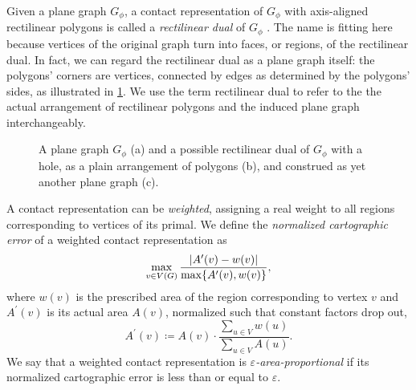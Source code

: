 Given a plane graph $G_\phi$, a contact representation of $G_\phi$ with axis-aligned rectilinear polygons is called a \emph{rectilinear dual} of $G_\phi$ \cite{alam2013computing}.
The name  is fitting here because vertices of the original graph turn into faces, or regions, of the rectilinear dual.
In fact, we can regard the rectilinear dual as a plane graph itself: the polygons' corners are vertices, connected by edges as determined by the polygons' sides, as illustrated in \cref{fig:preliminaries-rectilinear-dual}.
We use the term rectilinear dual to refer to the the actual arrangement of rectilinear polygons and the induced plane graph interchangeably.

\begin{figure}[H]
	\centering
	\quad
	\quad
	\caption{A plane graph $G_\phi$ (a) and a possible rectilinear dual of $G_\phi$ with a hole, as a plain arrangement of polygons (b), and construed as yet another plane graph (c).}
	\label{fig:preliminaries-rectilinear-dual}
\end{figure}

A contact representation can be \emph{weighted}, assigning a real weight to all regions corresponding to vertices of its primal.
We define the \emph{normalized cartographic error} \cite{alam2015quantitative} of a weighted contact representation as
%
\begin{equation*}
    \max\limits_{v \in V(G)} \frac{\left\lvert A^\prime(v) - w(v)\right\rvert}{\max\{A^\prime(v),w(v)\}},
\end{equation*}
%
where $w(v)$ is the prescribed area of the region corresponding to vertex $v$ and $A^\prime(v)$ is its actual area $A(v)$, normalized such that constant factors drop out, \ie{}
%
\begin{equation*}
	A^\prime(v) \coloneqq A(v) \cdot \frac{\sum\limits_{u \in V}{w(u)}}{\sum\limits_{u \in V}{A(u)}}.
\end{equation*}
%
We say that a weighted contact representation is \emph{$\varepsilon$-area-proportional} if its normalized cartographic error is less than or equal to $\varepsilon$.



